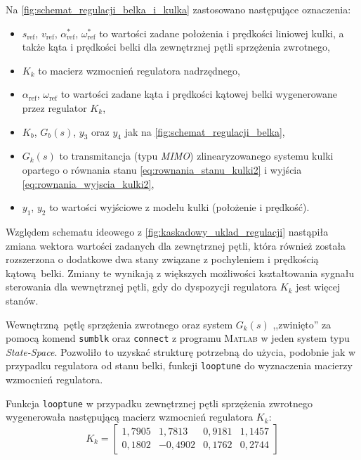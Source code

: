 Na \cref{fig:schemat_regulacji_belka_i_kulka} zastosowano następujące oznaczenia:
\begin{itemize}
    \item $s_\text{ref}$, $v_\text{ref}$, $\alpha_\text{ref}^*$, $\omega_\text{ref}^*$ to wartości zadane położenia i prędkości liniowej kulki, a także kąta i prędkości belki dla zewnętrznej pętli sprzężenia zwrotnego,
    \item $K_k$ to macierz wzmocnień regulatora nadrzędnego,
    \item $\alpha_\text{ref}$, $\omega_\text{ref}$ to wartości zadane kąta i prędkości kątowej belki wygenerowane przez regulator $K_k$,
    \item $K_b$, $G_b(s)$, $y_3$ oraz $y_4$ jak na \cref{fig:schemat_regulacji_belka},
    \item $G_k(s)$ to transmitancja (typu \textit{MIMO}) zlinearyzowanego systemu kulki opartego o równania stanu \eqref{eq:rownania_stanu_kulki2} i wyjścia \eqref{eq:rownania_wyjscia_kulki2},
    \item $y_1$, $y_2$ to wartości wyjściowe z modelu kulki (położenie i prędkość).
\end{itemize}

Względem schematu ideowego z \cref{fig:kaskadowy_uklad_regulacji} nastąpiła zmiana wektora wartości zadanych dla zewnętrznej pętli, która również została rozszerzona o dodatkowe dwa stany związane z pochyleniem i prędkością kątową belki. Zmiany te wynikają z większych możliwości kształtowania sygnału sterowania dla wewnętrznej pętli, gdy do dyspozycji regulatora $K_k$ jest więcej stanów.

Wewnętrzną pętlę sprzężenia zwrotnego oraz system $G_k(s)$ ,,zwinięto'' za pomocą komend \texttt{sumblk} oraz \texttt{connect} z programu \textsc{Matlab} w jeden system typu \textit{State-Space}. Pozwoliło to uzyskać strukturę potrzebną do użycia, podobnie jak w przypadku regulatora od stanu belki, funkcji \texttt{looptune} do wyznaczenia macierzy wzmocnień regulatora.

Funkcja \texttt{looptune} w przypadku zewnętrznej pętli sprzężenia zwrotnego wygenerowała następującą macierz wzmocnień regulatora $K_k$:
\begin{equation}
    K_k = \begin{bmatrix}
    1,7905 &  1,7813 &  0,9181 &  1,1457 \\
    0,1802 & -0,4902 &  0,1762 &  0,2744
    \end{bmatrix} \label{eq:regulator_kulki}
\end{equation}

